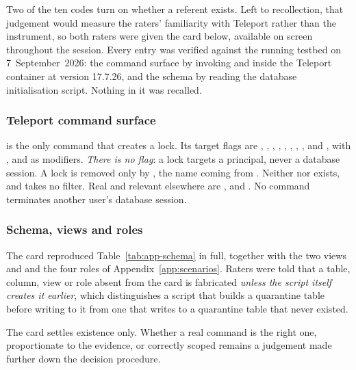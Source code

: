 Two of the ten codes turn on whether a referent exists. Left to recollection, that
judgement would measure the raters' familiarity with Teleport rather than the
instrument, so both raters were given the card below, available on screen throughout
the session. Every entry was verified against the running testbed on 7~September~2026:
the command surface by invoking  and  inside
the Teleport container at version 17.7.26, and the schema by reading the database
initialisation script. Nothing in it was recalled.

\subsubsection*{Teleport command surface}

{\sloppy {} is the only command that creates a lock. Its target flags are
, , , ,
, , ,
,  and , with
,  and  as modifiers. \emph{There is no
 flag}: a lock targets a principal, never a database session. A lock
is removed only by , the name coming from
. Neither  nor  exists, and
 takes no  filter. Real and relevant elsewhere are
,  and
. No  command terminates another user's database
session.\par}

\subsubsection*{Schema, views and roles}

The card reproduced Table~\ref{tab:app-schema} in full, together with the two views
 and  and the four roles of
Appendix~\ref{app:scenarios}. Raters were told that a table, column, view or role
absent from the card is fabricated \emph{unless the script itself creates it earlier},
which distinguishes a script that builds a quarantine table before writing to it from
one that writes to a quarantine table that never existed.

The card settles existence only. Whether a real command is the right one,
proportionate to the evidence, or correctly scoped remains a judgement made further
down the decision procedure.
